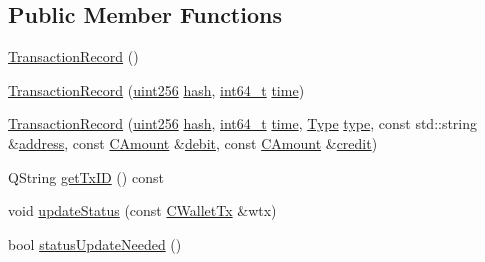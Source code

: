 \subsection*{Public Member Functions}
\begin{DoxyCompactItemize}
\item 
\hyperlink{class_transaction_record_abb95ce852c0d00e86dcf7ebf63e70a83}{Transaction\+Record} ()
\item 
\hyperlink{class_transaction_record_a41ad952a50648e0c48ecd423506100c1}{Transaction\+Record} (\hyperlink{classuint256}{uint256} \hyperlink{class_transaction_record_a7a89b1316eb6e7c14be17cb8448ae586}{hash}, \hyperlink{stdint_8h_adec1df1b8b51cb32b77e5b86fff46471}{int64\+\_\+t} \hyperlink{class_transaction_record_afd105941a1ce3788f86573d17e999a8e}{time})
\item 
\hyperlink{class_transaction_record_aa346355a8fdcc358010eb6e7b2f59a41}{Transaction\+Record} (\hyperlink{classuint256}{uint256} \hyperlink{class_transaction_record_a7a89b1316eb6e7c14be17cb8448ae586}{hash}, \hyperlink{stdint_8h_adec1df1b8b51cb32b77e5b86fff46471}{int64\+\_\+t} \hyperlink{class_transaction_record_afd105941a1ce3788f86573d17e999a8e}{time}, \hyperlink{class_transaction_record_afb76f5876fba21c3d2c388b98a35d685}{Type} \hyperlink{class_transaction_record_a6a68c861c3f1f10971fa11d8fc7c46e1}{type}, const std\+::string \&\hyperlink{class_transaction_record_ad8d3d2765f95a40afc6cd93d4a881a38}{address}, const \hyperlink{amount_8h_a4eaf3a5239714d8c45b851527f7cb564}{C\+Amount} \&\hyperlink{class_transaction_record_a536fdaa56c7f7fb789f064cc475d30c1}{debit}, const \hyperlink{amount_8h_a4eaf3a5239714d8c45b851527f7cb564}{C\+Amount} \&\hyperlink{class_transaction_record_aea9d8e5ead391ada02422cef6f45d9c7}{credit})
\item 
Q\+String \hyperlink{class_transaction_record_a8f3795b100c3c4653249d2c96a898c0d}{get\+Tx\+I\+D} () const 
\item 
void \hyperlink{class_transaction_record_a9b643dd885a790ae511705a1446556be}{update\+Status} (const \hyperlink{class_c_wallet_tx}{C\+Wallet\+Tx} \&wtx)
\item 
bool \hyperlink{class_transaction_record_aaca6757b7b300151694021be6af18d11}{status\+Update\+Needed} ()
\end{DoxyCompactItemize}

